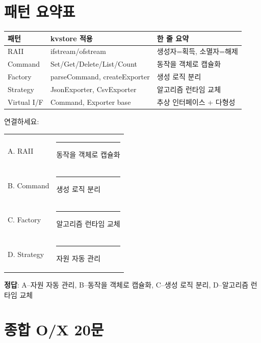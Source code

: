 \documentclass[11pt,a4paper]{article}
\begin{document}
\section{패턴 요약표}

\begin{center}
\begin{tabularx}{\textwidth}{@{}llX@{}}
\toprule
\textbf{패턴} & \textbf{kvstore 적용} & \textbf{한 줄 요약} \\
\midrule
RAII & ifstream/ofstream & 생성자=획득, 소멸자=해제 \\
Command & Set/Get/Delete/List/Count & 동작을 객체로 캡슐화 \\
Factory & parseCommand, createExporter & 생성 로직 분리 \\
Strategy & JsonExporter, CsvExporter & 알고리즘 런타임 교체 \\
Virtual I/F & Command, Exporter base & 추상 인터페이스 + 다형성 \\
\bottomrule
\end{tabularx}
\end{center}

\begin{quizbox}[title={Q: 패턴 매칭}]
연결하세요:
\begin{tabularx}{\textwidth}{@{}lX@{}}
A. RAII & \rule{2cm}{0.4pt} 동작을 객체로 캡슐화 \\
B. Command & \rule{2cm}{0.4pt} 생성 로직 분리 \\
C. Factory & \rule{2cm}{0.4pt} 알고리즘 런타임 교체 \\
D. Strategy & \rule{2cm}{0.4pt} 자원 자동 관리 \\
\end{tabularx}

\textbf{정답}: A--자원 자동 관리, B--동작을 객체로 캡슐화, C--생성 로직 분리, D--알고리즘 런타임 교체
\end{quizbox}


\section{종합 O/X 20문}
\end{document}
